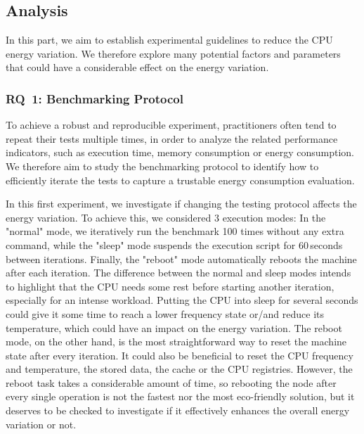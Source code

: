 \subsection{Analysis}\label{subsec:parameters}
In this part, we aim to establish experimental guidelines to reduce the CPU energy variation.
We therefore explore many potential factors and parameters that could have a considerable effect on the energy variation.


\subsubsection{\textsc{RQ}~1: Benchmarking Protocol}
To achieve a robust and reproducible experiment, practitioners often tend to repeat their tests multiple times, in order to analyze the related performance indicators, such as execution time, memory consumption or energy consumption.
We therefore aim to study the benchmarking protocol to identify how to efficiently iterate the tests to capture a trustable energy consumption evaluation.

In this first experiment, we investigate if changing the testing protocol affects the energy variation.
To achieve this, we considered 3 execution modes:
In the \textsf{"normal"} mode, we iteratively run the benchmark 100 times without any extra command, while the \textsf{"sleep"} mode suspends the execution script for 60\,seconds between iterations.
Finally, the \textsf{"reboot"} mode automatically reboots the machine after each iteration.
The difference between the \textsf{normal} and \textsf{sleep} modes intends to highlight that the CPU needs some rest before starting another iteration, especially for an intense workload.
Putting the CPU into sleep for several seconds could give it some time to reach a lower frequency state or/and reduce its temperature, which could have an impact on the energy variation.
The \textsf{reboot} mode, on the other hand, is the most straightforward way to reset the machine state after every iteration.
It could also be beneficial to reset the CPU frequency and temperature, the stored data, the cache or the CPU registries.
However, the reboot task takes a considerable amount of time, so rebooting the node after every single operation is not the fastest nor the most eco-friendly solution, but it deserves to be checked to investigate if it effectively enhances the overall energy variation or not.

